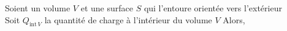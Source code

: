 ﻿\documentclass[a4paper]{article}
\begin{document}
\pagestyle{fancy}
\fancyhf{}
\setlength{\headheight}{15pt}

\begin{center}
	\large{}
\end{center}


Soient un volume $V$ et une surface $S$ qui l'entoure orientée vers l'extérieur\\
Soit $Q_{\mathrm{int}\,V}$ la quantité de charge à l'intérieur du volume $V$
Alors,
\begin{center}
\end{center}
\end{document}
